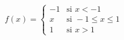 \item $f(x) = \begin{cases} -1 & \text{si } x < -1 \\ x & \text{si } -1 \le x \le 1 \\ 1 & \text{si } x > 1 \end{cases}$
